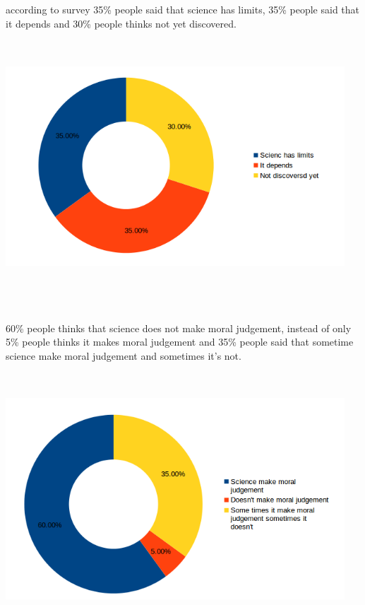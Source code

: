 \documentclass[12pt]{report}
\begin{document}
\subsubsection{} according to survey 35\% people said that science has limits, 35\% people said that it depends and 30\% people thinks not yet discovered.
\\
\includegraphics[width=5in,height=4in]{4.png}
\newpage
\LARGE

\subsubsection{}  60\% people thinks that science does not make moral judgement, instead of only 5\% people thinks it makes moral judgement and 35\% people said that sometime science make moral judgement and sometimes it's not.
\\

\includegraphics[width=5in,height=4in]{5.png}
\newpage
\LARGE
\end{document}
